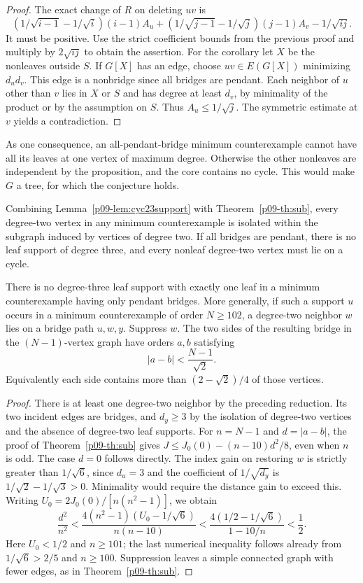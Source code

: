 \documentclass[11pt,a4paper]{article}
\begin{document}
\begin{proof}
The exact change of $R$ on deleting $uv$ is
\[
 (1/\sqrt{i-1}-1/\sqrt i)(i-1)A_u+
 (1/\sqrt{j-1}-1/\sqrt j)(j-1)A_v-1/\sqrt{ij}.
\]
It must be positive. Use the strict coefficient bounds from the
previous proof and multiply by $2\sqrt{ij}$ to obtain the assertion.
For the corollary let $X$ be the nonleaves outside $S$. If $G[X]$
has an edge, choose $uv\in E(G[X])$ minimizing $d_ud_v$. This edge
is a nonbridge since all bridges are pendant. Each neighbor of $u$
other than $v$ lies in $X$ or $S$ and has degree at least $d_v$,
by minimality of the product or by the assumption on $S$. Thus
$A_u\le1/\sqrt j$. The symmetric estimate at $v$ yields a
contradiction.
\end{proof}
As one consequence, an all-pendant-bridge minimum counterexample
cannot have all its leaves at one vertex of maximum degree. Otherwise the
other nonleaves are independent by the proposition, and the core
contains no cycle. This would make $G$ a tree, for which the
conjecture holds.

Combining Lemma~\ref{p09-lem:cyc23support} with Theorem~\ref{p09-th:sub}, every
degree-two vertex in any minimum counterexample is isolated within
the subgraph induced by vertices of degree two. If all bridges are
pendant, there is no leaf support of degree three, and every nonleaf
degree-two vertex must lie on a cycle.

\begin{corollary}\label{p09-cor:bridgebalance}
There is no degree-three leaf support with exactly one leaf in a
minimum counterexample having only pendant bridges. More generally,
if such a support $u$ occurs in a minimum counterexample of order
$N\ge102$, a degree-two neighbor $w$ lies on a bridge path $u,w,y$.
Suppress $w$. The two sides of the resulting bridge in the
$(N-1)$-vertex graph have orders $a,b$ satisfying
\[
                |a-b|<\frac{N-1}{\sqrt2}.
\]
Equivalently each side contains more than $(2-\sqrt2)/4$ of those
vertices.
\end{corollary}
\begin{proof}
There is at least one degree-two neighbor by the preceding reduction.
Its two incident edges are bridges, and $d_y\ge3$ by the isolation
of degree-two vertices and the absence of degree-two leaf supports.
For $n=N-1$ and $d=|a-b|$, the proof of Theorem~\ref{p09-th:sub} gives
$J\le J_0(0)-(n-10)d^2/8$, even when $n$ is odd. The case $d=0$
follows directly. The index gain on restoring $w$ is strictly greater
than $1/\sqrt6$, since $d_u=3$ and the coefficient of $1/\sqrt{d_y}$
is $1/\sqrt2-1/\sqrt3>0$. Minimality would require the distance
gain to exceed this. Writing $U_0=2J_0(0)/[n(n^2-1)]$, we obtain
\[
 \frac{d^2}{n^2}<
 \frac{4(n^2-1)(U_0-1/\sqrt6)}{n(n-10)}
 <\frac{4(1/2-1/\sqrt6)}{1-10/n}<\frac12 .
\]
Here $U_0<1/2$ and $n\ge101$; the last numerical inequality follows
already from $1/\sqrt6>2/5$ and $n\ge100$. Suppression leaves a
simple connected graph with fewer edges, as in Theorem~\ref{p09-th:sub}.
\end{proof}
\end{document}
